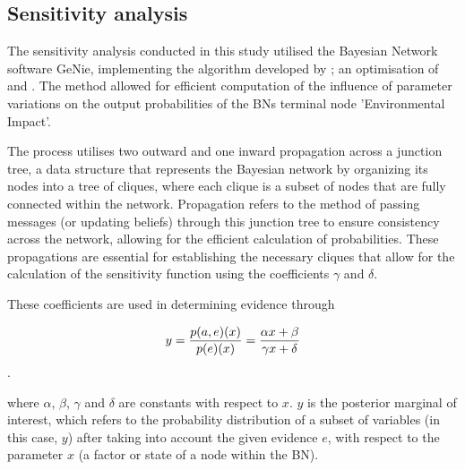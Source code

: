 \subsection{Sensitivity analysis}
The sensitivity analysis conducted in this study utilised the Bayesian Network software GeNie, implementing the algorithm developed by \textcite{article}; an optimisation of \textcite{Castillo1996ANM} and \textcite{Gaag1998PracticableSA}. The method allowed for efficient computation of the influence of parameter variations on the output probabilities of the BNs terminal node 'Environmental Impact'.

The process utilises two outward and one inward propagation across a junction tree, a data structure that represents the Bayesian network by organizing its nodes into a tree of cliques, where each clique is a subset of nodes that are fully connected within the network. Propagation refers to the method of passing messages (or updating beliefs) through this junction tree to ensure consistency across the network, allowing for the efficient calculation of probabilities. These propagations are essential for establishing the necessary cliques that allow for the calculation of the sensitivity function using the coefficients $\gamma$ and $\delta$.

These coefficients are used in determining evidence through

\begin{equation}
y = {{p(a, e)(x)}\over{p(e)(x)}}={{\alpha x + \beta}\over{\gamma x + \delta}}
\end{equation}.

where $\alpha$, $\beta$, $\gamma$ and $\delta$ are constants with respect to $x$. $y$ is the posterior marginal of interest, which refers to the probability distribution of a subset of variables (in this case, $y$) after taking into account the given evidence $e$, with respect to the parameter $x$ (a factor or state of a node within the BN).





